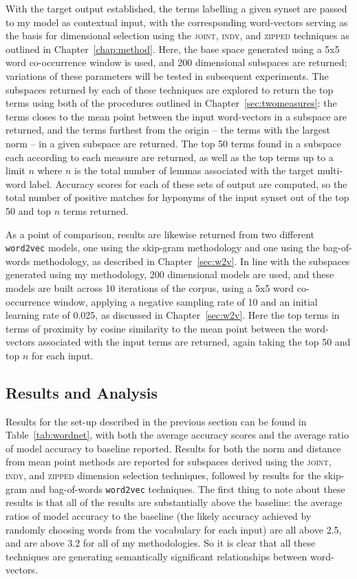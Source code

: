 With the target output established, the terms labelling a given synset are passed to my model as contextual input, with the corresponding word-vectors serving as the basis for dimensional selection using the \textsc{joint}, \textsc{indy}, and \textsc{zipped} techniques as outlined in Chapter~\ref{chap:method}.  Here, the base space generated using a 5x5 word co-occurrence window is used, and 200 dimensional subspaces are returned; variations of these parameters will be tested in subsequent experiments.  The subspaces returned by each of these techniques are explored to return the top terms using both of the procedures outlined in Chapter~\ref{sec:twomeasures}: the terms closes to the mean point between the input word-vectors in a subspace are returned, and the terms furthest from the origin -- the terms with the largest norm -- in a given subspace are returned.  The top 50 terms found in a subspace each according to each measure are returned, as well as the top terms up to a limit $n$ where $n$ is the total number of lemmas associated with the target multi-word label.  Accuracy scores for each of these sets of output are computed, so the total number of positive matches for hyponyms of the input synset out of the top 50 and top $n$ terms returned.

As a point of comparison, results are likewise returned from two different \texttt{word2vec} models, one using the skip-gram methodology and one using the bag-of-words methodology, as described in Chapter~\ref{sec:w2v}.  In line with the subspaces generated using my methodology, 200 dimensional models are used, and these models are built across 10 iterations of the corpus, using a 5x5 word co-occurrence window, applying a negative sampling rate of 10 and an initial learning rate of 0.025, as discussed in Chapter~\ref{sec:w2v}.  Here the top terms in terms of proximity by cosine similarity to the mean point between the word-vectors associated with the input terms are returned, again taking the top 50 and top $n$ for each input.

\subsection{Results and Analysis}
Results for the set-up described in the previous section can be found in Table~\ref{tab:wordnet}, with both the average accuracy scores and the average ratio of model accuracy to baseline reported.  Results for both the norm and distance from mean point methods are reported for subspaces derived using the \textsc{joint}, \textsc{indy}, and \textsc{zipped} dimension selection techniques, followed by results for the skip-gram and bag-of-words \texttt{word2vec} techniques.  The first thing to note about these results is that all of the results are substantially above the baseline: the average ratios of model accuracy to the baseline (the likely accuracy achieved by randomly choosing words from the vocabulary for each input) are all above 2.5, and are above 3.2 for all of my methodologies.  So it is clear that all these techniques are generating semantically significant relationships between word-vectors.

